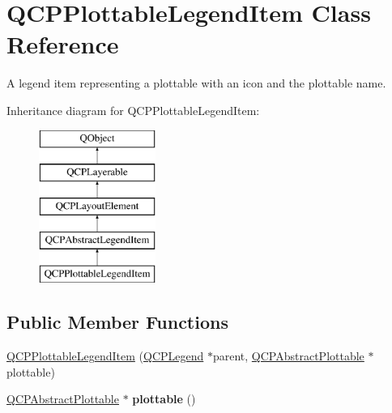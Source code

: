 \hypertarget{classQCPPlottableLegendItem}{}\section{Q\+C\+P\+Plottable\+Legend\+Item Class Reference}
\label{classQCPPlottableLegendItem}


A legend item representing a plottable with an icon and the plottable name.  


Inheritance diagram for Q\+C\+P\+Plottable\+Legend\+Item\+:\begin{figure}[H]
\begin{center}
\leavevmode
\includegraphics[height=5.000000cm]{classQCPPlottableLegendItem}
\end{center}
\end{figure}
\subsection*{Public Member Functions}
\begin{DoxyCompactItemize}
\item 
\hyperlink{classQCPPlottableLegendItem_ac1072591fe409d3dabad51b23ee4d6c5}{Q\+C\+P\+Plottable\+Legend\+Item} (\hyperlink{classQCPLegend}{Q\+C\+P\+Legend} $\ast$parent, \hyperlink{classQCPAbstractPlottable}{Q\+C\+P\+Abstract\+Plottable} $\ast$plottable)
\item 
\hypertarget{classQCPPlottableLegendItem_af29e9a2c60b4cba0cac2447b8af7b488}{}\hyperlink{classQCPAbstractPlottable}{Q\+C\+P\+Abstract\+Plottable} $\ast$ {\bfseries plottable} ()\label{classQCPPlottableLegendItem_af29e9a2c60b4cba0cac2447b8af7b488}

\end{DoxyCompactItemize}
